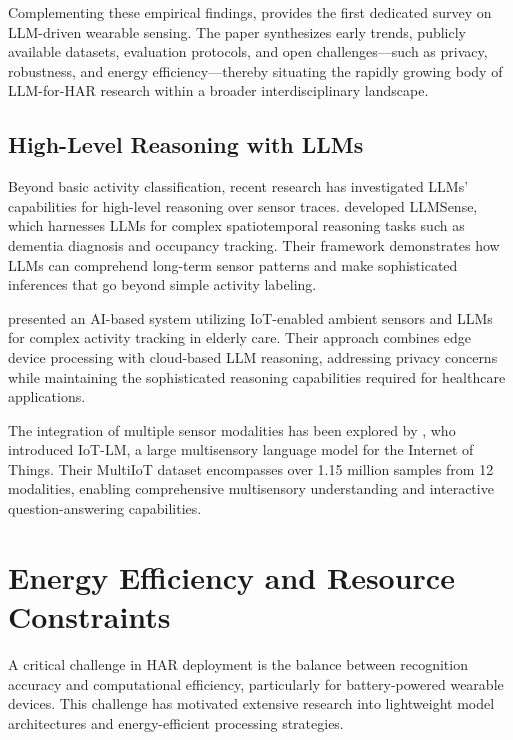 Complementing these empirical findings, \cite{Ferrara2024LLMSurvey} provides the first dedicated survey on LLM-driven wearable sensing. The paper synthesizes early trends, publicly available datasets, evaluation protocols, and open challenges—such as privacy, robustness, and energy efficiency—thereby situating the rapidly growing body of LLM-for-HAR research within a broader interdisciplinary landscape.

\subsection{High-Level Reasoning with LLMs}

\hspace{2em}Beyond basic activity classification, recent research has investigated LLMs' capabilities for high-level reasoning over sensor traces. \cite{Ouyang2024LLMSense} developed LLMSense, which harnesses LLMs for complex spatiotemporal reasoning tasks such as dementia diagnosis and occupancy tracking. Their framework demonstrates how LLMs can comprehend long-term sensor patterns and make sophisticated inferences that go beyond simple activity labeling.

\cite{Sun2024IoTActivity} presented an AI-based system utilizing IoT-enabled ambient sensors and LLMs for complex activity tracking in elderly care. Their approach combines edge device processing with cloud-based LLM reasoning, addressing privacy concerns while maintaining the sophisticated reasoning capabilities required for healthcare applications.

The integration of multiple sensor modalities has been explored by \cite{Mo2024IoTLM}, who introduced IoT-LM, a large multisensory language model for the Internet of Things. Their MultiIoT dataset encompasses over 1.15 million samples from 12 modalities, enabling comprehensive multisensory understanding and interactive question-answering capabilities.

\section{Energy Efficiency and Resource Constraints}

\hspace{2em}A critical challenge in HAR deployment is the balance between recognition accuracy and computational efficiency, particularly for battery-powered wearable devices. This challenge has motivated extensive research into lightweight model architectures and energy-efficient processing strategies.

